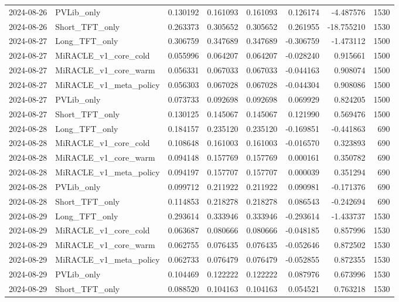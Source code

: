 \begin{tabular}{llrrrrrr}
2024-08-26 & PVLib_only & 0.130192 & 0.161093 & 0.161093 & 0.126174 & -4.487576 & 1530 \\
2024-08-26 & Short_TFT_only & 0.263373 & 0.305652 & 0.305652 & 0.261955 & -18.755210 & 1530 \\
2024-08-27 & Long_TFT_only & 0.306759 & 0.347689 & 0.347689 & -0.306759 & -1.473112 & 1500 \\
2024-08-27 & MiRACLE_v1_core_cold & 0.055996 & 0.064207 & 0.064207 & -0.028240 & 0.915661 & 1500 \\
2024-08-27 & MiRACLE_v1_core_warm & 0.056331 & 0.067033 & 0.067033 & -0.044163 & 0.908074 & 1500 \\
2024-08-27 & MiRACLE_v1_meta_policy & 0.056303 & 0.067028 & 0.067028 & -0.044304 & 0.908086 & 1500 \\
2024-08-27 & PVLib_only & 0.073733 & 0.092698 & 0.092698 & 0.069929 & 0.824205 & 1500 \\
2024-08-27 & Short_TFT_only & 0.130125 & 0.145067 & 0.145067 & 0.121990 & 0.569476 & 1500 \\
2024-08-28 & Long_TFT_only & 0.184157 & 0.235120 & 0.235120 & -0.169851 & -0.441863 & 690 \\
2024-08-28 & MiRACLE_v1_core_cold & 0.108648 & 0.161003 & 0.161003 & -0.016570 & 0.323893 & 690 \\
2024-08-28 & MiRACLE_v1_core_warm & 0.094148 & 0.157769 & 0.157769 & 0.000161 & 0.350782 & 690 \\
2024-08-28 & MiRACLE_v1_meta_policy & 0.094197 & 0.157707 & 0.157707 & 0.000039 & 0.351294 & 690 \\
2024-08-28 & PVLib_only & 0.099712 & 0.211922 & 0.211922 & 0.090981 & -0.171376 & 690 \\
2024-08-28 & Short_TFT_only & 0.114853 & 0.218278 & 0.218278 & 0.086543 & -0.242694 & 690 \\
2024-08-29 & Long_TFT_only & 0.293614 & 0.333946 & 0.333946 & -0.293614 & -1.433737 & 1530 \\
2024-08-29 & MiRACLE_v1_core_cold & 0.063687 & 0.080666 & 0.080666 & -0.048185 & 0.857996 & 1530 \\
2024-08-29 & MiRACLE_v1_core_warm & 0.062755 & 0.076435 & 0.076435 & -0.052646 & 0.872502 & 1530 \\
2024-08-29 & MiRACLE_v1_meta_policy & 0.062733 & 0.076479 & 0.076479 & -0.052855 & 0.872355 & 1530 \\
2024-08-29 & PVLib_only & 0.104469 & 0.122222 & 0.122222 & 0.087976 & 0.673996 & 1530 \\
2024-08-29 & Short_TFT_only & 0.088520 & 0.104163 & 0.104163 & 0.054521 & 0.763218 & 1530 \\

\end{tabular}
